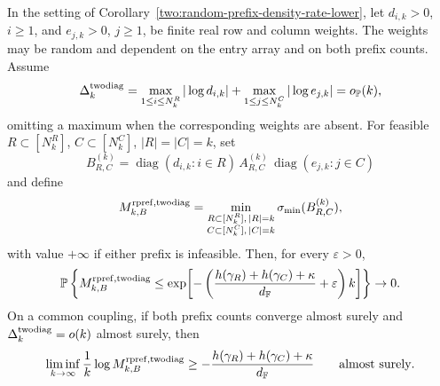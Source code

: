 \begin{corollary}\label{two:random-prefix-diagonal-conditioning-transfer}
In the setting of Corollary~\ref{two:random-prefix-density-rate-lower}, let
\(d_{i,k}>0\), \(i\ge1\), and \(e_{j,k}>0\), \(j\ge1\), be finite real row and
column weights.  The weights may be random and dependent on the entry array and
on both prefix counts.  Assume
\[
  \Delta_k^{\rm twodiag}
  =
  \max_{1\le i\le N_k^R}|\log d_{i,k}|
  +\max_{1\le j\le N_k^C}|\log e_{j,k}|
  =o_{\mathbb{P}}(k),
\]
omitting a maximum when the corresponding weights are absent.  For feasible
\(R\subset[N_k^R]\), \(C\subset[N_k^C]\), \(|R|=|C|=k\), set
\[
  B_{R,C}^{(k)}
  =
  \operatorname{diag}(d_{i,k}:i\in R)\,
  A_{R,C}^{(k)}\,
  \operatorname{diag}(e_{j,k}:j\in C)
\]
and define
\[
  M_{k,B}^{\rm rpref,twodiag}
  =
  \min_{\substack{R\subset[N_k^{R}],\, |R|=k\\
                  C\subset[N_k^{C}],\, |C|=k}}
  \sigma_{\min}(B_{R,C}^{(k)}),
\]
with value \(+\infty\) if either prefix is infeasible.  Then, for every
\(\varepsilon>0\),
\[
  \mathbb{P}\left\{
  M_{k,B}^{\rm rpref,twodiag}\le
  \exp\!\left[-\left(
  \frac{h(\gamma_R)+h(\gamma_C)+\kappa}{d_{\mathbb{F}}}+\varepsilon
  \right)k\right]\right\}\to0.
\]
On a common coupling, if both prefix counts converge almost surely and
\(\Delta_k^{\rm twodiag}=o(k)\) almost surely, then
\[
  \liminf_{k\to\infty}\frac1k\log M_{k,B}^{\rm rpref,twodiag}
  \ge
  -\frac{h(\gamma_R)+h(\gamma_C)+\kappa}{d_{\mathbb{F}}}
  \qquad\hbox{almost surely}.
\]
\end{corollary}

